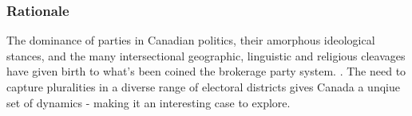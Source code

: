 \subsubsection{Rationale}

The dominance of parties in Canadian politics, their amorphous ideological
stances, and the many intersectional geographic, linguistic and religious
cleavages have given birth to what’s been coined the brokerage party system.
\cite{carty2010political}. The need to capture pluralities in a diverse range of
electoral districts gives Canada a unqiue set of dynamics - making it an
interesting case to explore.